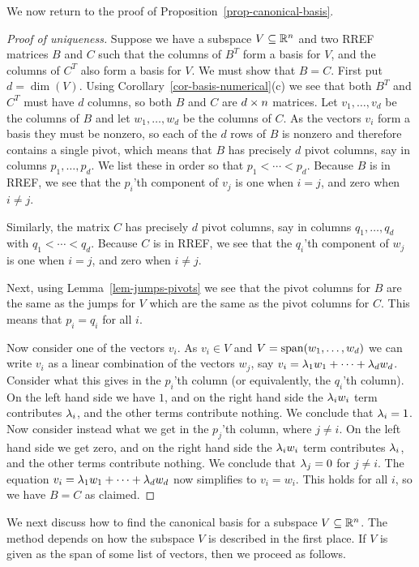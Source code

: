 \documentclass[reqno]{amsart}
\theoremstyle{definition}
\begin{document}
We now return to the proof of Proposition~\ref{prop-canonical-basis}.
\begin{proof}[Proof of uniqueness]
 Suppose we have a subspace $V\subseteq{\mathbb{R}}^n$ and two RREF matrices $B$ and
 $C$ such that the columns of $B^T$ form a basis for $V$, and the
 columns of $C^T$ also form a basis for $V$.  We must show that $B=C$.
 First put $d=\dim(V)$.  Using Corollary~\ref{cor-basis-numerical}(c)
 we see that both $B^T$ and $C^T$ must have $d$ columns, so both $B$
 and $C$ are $d\times n$ matrices.  Let $v_1,\dotsc,v_d$ be the columns
 of $B$ and let $w_1,\dotsc,w_d$ be the columns of $C$.  As the
 vectors $v_i$ form a basis they must be nonzero, so each of the $d$
 rows of $B$ is nonzero and therefore contains a single pivot, which
 means that $B$ has precisely $d$ pivot columns, say in columns
 $p_1,\dotsc,p_d$.  We list these in order so that $p_1<\dotsb<p_d$.
 Because $B$ is in RREF, we see that the $p_i$'th component of $v_j$
 is one when $i=j$, and zero when $i\neq j$.

 Similarly, the matrix $C$ has precisely $d$ pivot columns, say in
 columns $q_1,\dotsc,q_d$ with $q_1<\dotsb<q_d$.  Because $C$ is in
 RREF, we see that the $q_i$'th component of $w_j$ is one when $i=j$,
 and zero when $i\neq j$.

 Next, using Lemma~\ref{lem-jumps-pivots} we see that the pivot
 columns for $B$ are the same as the jumps for $V$ which are the same
 as the pivot columns for $C$.  This means that $p_i=q_i$ for all $i$.

 Now consider one of the vectors $v_i$.  As $v_i\in V$ and
 $V=\operatorname{span}(w_1,\dotsc,w_d)$ we can write $v_i$ as a linear combination
 of the vectors $w_j$, say $v_i=\lambda_1w_1+\dotsb+\lambda_dw_d$.  Consider
 what this gives in the $p_i$'th column (or equivalently, the $q_i$'th
 column).  On the left hand side we have $1$, and on the right hand
 side the $\lambda_iw_i$ term contributes $\lambda_i$, and the other terms
 contribute nothing.  We conclude that $\lambda_i=1$.  Now consider
 instead what we get in the $p_j$'th column, where $j\neq i$.  On the
 left hand side we get zero, and on the right hand side the $\lambda_iw_i$
 term contributes $\lambda_i$, and the other terms contribute nothing.  We
 conclude that $\lambda_j=0$ for $j\neq i$.  The equation
 $v_i=\lambda_1w_1+\dotsb+\lambda_dw_d$ now simplifies to $v_i=w_i$.  This
 holds for all $i$, so we have $B=C$ as claimed.
\end{proof}

We next discuss how to find the canonical basis for a subspace
$V\subseteq{\mathbb{R}}^n$.  The method depends on how the subspace $V$ is described
in the first place.  If $V$ is given as the span of some list of
vectors, then we proceed as follows.
\end{document}
